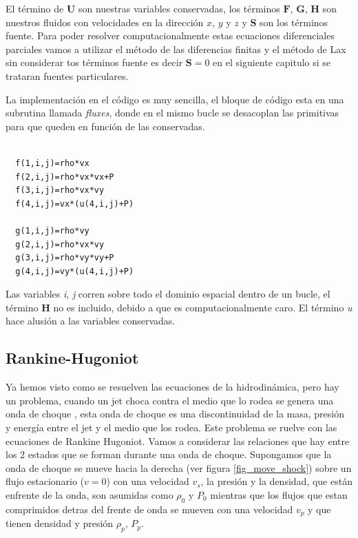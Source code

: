 \documentclass[12pt,a4paper]{book}
\begin{document}
El término de $\mathbf{U}$ son nuestras variables conservadas, los términos $\mathbf{F}$, $\mathbf{G}$, $\mathbf{H}$ son nuestros fluidos  con velocidades en la dirección $x$, $y$ y $z$ y $\mathbf{S}$ son los términos fuente. Para poder resolver computacionalmente estas ecuaciones diferenciales parciales vamos a utilizar el método de las diferencias finitas y el método de Lax sin considerar tos términos fuente es decir $\mathbf{S}=0$ en el siguiente capitulo si se trataran fuentes particulares.

La implementación en el código es muy sencilla, el bloque de código esta en una subrutina llamada \emph{fluxes}, 
donde en el mismo bucle se desacoplan las primitivas para que queden en función de las conservadas. 


\begin{lstlisting}[frame=single]

  f(1,i,j)=rho*vx
  f(2,i,j)=rho*vx*vx+P
  f(3,i,j)=rho*vx*vy
  f(4,i,j)=vx*(u(4,i,j)+P)

  g(1,i,j)=rho*vy
  g(2,i,j)=rho*vx*vy
  g(3,i,j)=rho*vy*vy+P
  g(4,i,j)=vy*(u(4,i,j)+P)

\end{lstlisting}

Las variables \emph{i}, \emph{j} corren sobre todo el dominio espacial dentro de un bucle, el término $\mathbf{H}$ no es incluido, debido a que es computacionalmente 
caro. El término \emph{u} hace alusión a las variables conservadas.
  

\subsection{Rankine-Hugoniot}

Ya hemos visto como se resuelven las ecuaciones de la hidrodinámica, pero hay un problema, cuando un jet  choca contra el medio que lo rodea se genera una onda de choque
, esta onda de choque es una discontinuidad de la masa, presión y energía entre el jet y el medio que los rodea. Este problema se ruelve con las ecuaciones de 
Rankine Hugoniot.
Vamos a considerar las relaciones que hay entre los 2 estados que se forman durante una onda de choque. Supongamos que la onda de choque se mueve 
hacia la derecha (ver figura \ref{fig_move_shock}) sobre un flujo estacionario ($v = 0$) con una velocidad $v_s$, la presión y la densidad, que están enfrente de la onda, son asumidas como
$\rho_0$ y $P_0$ mientras que los flujos que estan comprimidos detras del frente de onda se mueven con una velocidad $v_p$ y que tienen
densidad y presión $\rho_p$, $P_p$.
\end{document}
